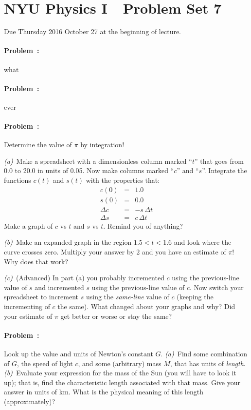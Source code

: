 \documentclass[12pt]{article}
\begin{document}
\section*{NYU Physics I---Problem Set 7}

Due Thursday 2016 October 27 at the beginning of lecture.

\paragraph{Problem~\theproblem:}%
what

\paragraph{Problem~\theproblem:}%
ever

\paragraph{Problem~\theproblem:}%
Determine the value of $\pi$ by integration!

\textsl{(a)}~Make a spreadsheet with a dimensionless column marked
``$t$'' that goes from 0.0 to 20.0 in units of 0.05.  Now make columns
marked ``$c$'' and ``$s$''.  Integrate the functions $c(t)$ and
$s(t)$ with the properties that:
\begin{eqnarray}\displaystyle
c(0) & = & 1.0 \\
s(0) & = & 0.0 \\
\Delta c & = & -s\,\Delta t \\
\Delta s & = & c\,\Delta t
\end{eqnarray}
Make a graph of $c$ vs $t$ and $s$ vs $t$.  Remind you of anything?

\textsl{(b)}~Make an expanded graph in the region $1.5<t<1.6$ and
look where the curve crosses zero.  Multiply your answer by 2 and you
have an estimate of $\pi$!  Why does that work?

\textsl{(c)}~(Advanced) In part (a) you probably incremented $c$ using
the previous-line value of $s$ and incremented $s$ using the
previous-line value of $c$.  Now switch your spreadsheet to increment
$s$ using the \emph{same-line} value of $c$ (keeping the incrementing
of $c$ the same).  What changed about your graphs and why?  Did your
estimate of $\pi$ get better or worse or stay the same?

\paragraph{Problem~\theproblem:}%
Look up the value and units of Newton's constant $G$.
\textsl{(a)}~Find some combination of $G$, the speed of light $c$, and
some (arbitrary) mass $M$, that has units of \emph{length}.
\textsl{(b)}~Evaluate your expression for the mass of the Sun (you
will have to look it up); that is, find the characteristic length
associated with that mass.  Give your answer in units of km.  What is
the physical meaning of this length (approximately)?
\end{document}
